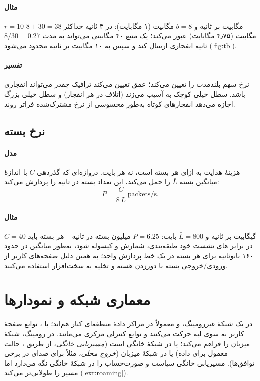 \documentclass[11pt,a4paper]{article}
\begin{document}
\paragraph{مثال}  $r = 10$ مگابیت بر ثانیه و $b = 8$ مگابیت (۱ مگابایت): در ۳ ثانیه حداکثر $8 + 30 = 38$
مگابیت (۴٫۷۵ مگابایت) عبور می‌کند؛ یک منبع ۴۰ مگابیتی می‌تواند به مدت $8/30 = 0.27$ ثانیه انفجاری ارسال کند و سپس به ۱۰
مگابیت بر ثانیه محدود می‌شود (\cref{fig:tb}).
\paragraph{تفسیر} نرخ سهم بلندمدت را تعیین می‌کند؛ عمق تعیین می‌کند ترافیک چقدر می‌تواند انفجاری باشد. سطل خیلی کوچک به
 آسیب می‌زند (اتلاف در هر انفجار) و سطل خیلی بزرگ اجازه می‌دهد انفجارهای کوتاه به‌طور محسوسی از نرخ مشترک‌شده
فراتر روند.

\begin{acnfigure}
  \caption{پوش سطل نشانه $b + rT$ (\cref{eq:tb}) و یک منبع با نرخ اوج.}
  \label{fig:tb}
\end{acnfigure}

\subsection{نرخ بسته}\label{sec:pps}
\paragraph{مدل} هزینهٔ هدایت به ازای هر بسته است، نه هر بایت. دروازه‌ای که گذردهی $C$ با اندازهٔ میانگین بستهٔ $\bar L$ را حمل
می‌کند، این تعداد بسته در ثانیه را پردازش می‌کند:
\begin{equation}\label{eq:pps}
  P = \frac{C}{8\,\bar L}\ \text{packets/s}.
\end{equation}
\paragraph{مثال} $C = 40$ گیگابیت بر ثانیه و $\bar L = 800$ بایت: $P = 6.25$ میلیون بسته در ثانیه -- هر بسته باید در برابر
های نشست خود طبقه‌بندی، شمارش و کپسوله شود، به‌طور میانگین در حدود ۱۶۰ نانوثانیه برای هر بسته در یک خط
پردازش واحد؛ به همین دلیل صفحه‌های کاربر از ورودی/خروجی بسته با دورزدن هسته و تخلیه به سخت‌افزار استفاده می‌کنند.

\section{معماری شبکه و نمودارها}
در یک شبکهٔ غیررومینگ،  و  معمولاً در مراکز دادهٔ منطقه‌ای کنار هم‌اند؛ با ، توابع صفحهٔ کاربر
به سوی لبه حرکت می‌کنند و توابع کنترلی مرکزی می‌مانند. در رومینگ، شبکهٔ میزبان  را فراهم می‌کند؛  یا در
شبکهٔ خانگی است (\emph{مسیریابی خانگی}، از طریق ، حالت معمول برای داده) یا در شبکهٔ میزبان (\emph{خروج محلی}، مثلاً
برای صدای  در برخی توافق‌ها). مسیریابی خانگی سیاست و صورت‌حساب را در شبکهٔ خانگی نگه می‌دارد اما مسیر را
طولانی‌تر می‌کند (\cref{exr:roaming}).
\end{document}
